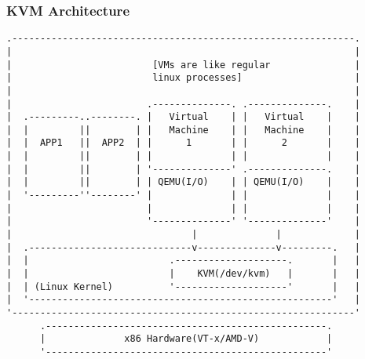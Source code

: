\documentclass[pdfte x,unicode,minimal,xcolor=table]{beamer}
\begin{document}
\begin{frame}[fragile]
\frametitle{KVM Architecture}
    \begin{verbatim}
.-------------------------------------------------------------.
|                                                             |
|                         [VMs are like regular               |
|                         linux processes]                    |
|                                                             |
|                        .--------------. .--------------.    |
|  .---------..--------. |   Virtual    | |   Virtual    |    |
|  |         ||        | |   Machine    | |   Machine    |    |
|  |  APP1   ||  APP2  | |      1       | |      2       |    |
|  |         ||        | |              | |              |    |
|  |         ||        | '--------------' .--------------.    |
|  |         ||        | | QEMU(I/O)    | | QEMU(I/O)    |    |
|  '---------''--------' |              | |              |    |
|                        |              | |              |    |
|                        '--------------' '--------------'    |
|                                |              |             |
|  .-----------------------------v--------------v---------.   |
|  |                         .--------------------.       |   |
|  |                         |    KVM(/dev/kvm)   |       |   |
|  | (Linux Kernel)          '--------------------'       |   |
|  '------------------------------------------------------'   |
'-------------------------------------------------------------'
      .--------------------------------------------------.
      |              x86 Hardware(VT-x/AMD-V)            |
      '--------------------------------------------------'
    \end{verbatim}
\end{frame}
\end{document}
